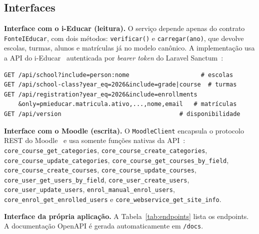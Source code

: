 \documentclass[12pt]{article}
\newcommand{\cod}[1]{\texttt{#1}}
\begin{document}
\subsection{Interfaces}

\textbf{Interface com o i-Educar (leitura).} O serviço depende apenas do
contrato \cod{FonteIEducar}, com dois métodos: \cod{verificar()} e
\cod{carregar(ano)}, que devolve escolas, turmas, alunos e matrículas já no
modelo canônico. A implementação usa a API do i-Educar~\cite{ieducar}
autenticada por \emph{bearer token} do Laravel Sanctum~\cite{sanctum}:

\begin{lstlisting}
GET /api/school?include=person:nome                    # escolas
GET /api/school-class?year_eq=2026&include=grade|course  # turmas
GET /api/registration?year_eq=2026&include=enrollments
    &only=pmieducar.matricula.ativo,...,nome,email   # matrículas
GET /api/version                                 # disponibilidade
\end{lstlisting}

\textbf{Interface com o Moodle (escrita).} O \cod{MoodleClient} encapsula o
protocolo REST do Moodle~\cite{moodlews} e usa somente funções nativas da
API~\cite{moodlewsapi}: \cod{core\_course\_get\_categories},
\cod{core\_course\_create\_categories}, \cod{core\_course\_update\_categories},
\cod{core\_course\_get\_courses\_by\_field}, \cod{core\_course\_create\_courses},
\cod{core\_course\_update\_courses}, \cod{core\_user\_get\_users\_by\_field},
\cod{core\_user\_create\_users}, \cod{core\_user\_update\_users},
\cod{enrol\_manual\_enrol\_users}, \cod{core\_enrol\_get\_enrolled\_users} e
\cod{core\_webservice\_get\_site\_info}.

\textbf{Interface da própria aplicação.} A Tabela~\ref{tab:endpoints} lista os
endpoints. A documentação OpenAPI é gerada automaticamente em \cod{/docs}.
\end{document}
